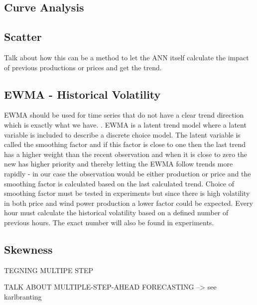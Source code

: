 \subsection{Curve Analysis}
\label{sec:curveAnalysis}

\subsection{Scatter}
\label{sec:scatterStrategy}
Talk about how this can be a method to let the ANN itself calculate the impact of previous productions or prices and get the trend.

\subsection{EWMA - Historical Volatility}
\label{sec:ewmaVolatility}

EWMA should be used for time series that do not have a clear trend direction\cite[Chapter~7.3.2]{econometrics} which is exactly what we have. . EWMA is a latent trend model where a latent variable is included to describe a discrete choice model. The latent variable is called the smoothing factor and if this factor is close to one then the last trend has a higher weight than the recent observation and when it is close to zero the new has higher priority and thereby letting the EWMA follow trends more rapidly - in our case the observation would be either production or price and the smoothing factor is calculated based on the last calculated trend. Choice of smoothing factor must be tested in experiments but since there is high volatility in both price and wind power production a lower factor could be expected. Every hour must calculate the historical volatility based on a defined number of previous hours. The exact number will also be found in experiments.

\subsection{Skewness}
\label{sec:skewness}



TEGNING MULTIPE STEP

TALK ABOUT MULTIPLE-STEP-AHEAD FORECASTING --> see karlbranting
